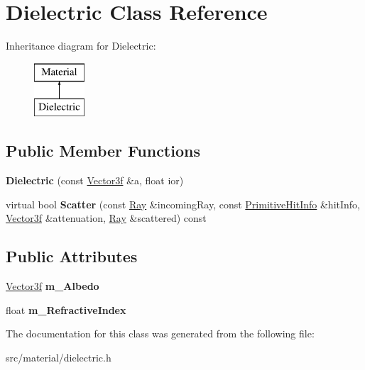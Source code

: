 \hypertarget{class_dielectric}{}\section{Dielectric Class Reference}
\label{class_dielectric}
Inheritance diagram for Dielectric\+:\begin{figure}[H]
\begin{center}
\leavevmode
\includegraphics[height=2.000000cm]{class_dielectric}
\end{center}
\end{figure}
\subsection*{Public Member Functions}
\begin{DoxyCompactItemize}
\item 
\mbox{\label{class_dielectric_aa4a60c7bb213188fae9962d8c8a1d7f2}} 
{\bfseries Dielectric} (const \mbox{\hyperlink{class_vector3}{Vector3f}} \&a, float ior)
\item 
\mbox{\label{class_dielectric_a2120ace1ac693d7ba685eb089c57cbf6}} 
virtual bool {\bfseries Scatter} (const \mbox{\hyperlink{class_ray}{Ray}} \&incoming\+Ray, const \mbox{\hyperlink{struct_primitive_hit_info}{Primitive\+Hit\+Info}} \&hit\+Info, \mbox{\hyperlink{class_vector3}{Vector3f}} \&attenuation, \mbox{\hyperlink{class_ray}{Ray}} \&scattered) const
\end{DoxyCompactItemize}
\subsection*{Public Attributes}
\begin{DoxyCompactItemize}
\item 
\mbox{\label{class_dielectric_ab5937d694c60301e3da24d52a8355e1c}} 
\mbox{\hyperlink{class_vector3}{Vector3f}} {\bfseries m\+\_\+\+Albedo}
\item 
\mbox{\label{class_dielectric_ab1f6cc9a1d134de5892447253ad5c107}} 
float {\bfseries m\+\_\+\+Refractive\+Index}
\end{DoxyCompactItemize}


The documentation for this class was generated from the following file\+:\begin{DoxyCompactItemize}
\item 
src/material/dielectric.\+h\end{DoxyCompactItemize}
